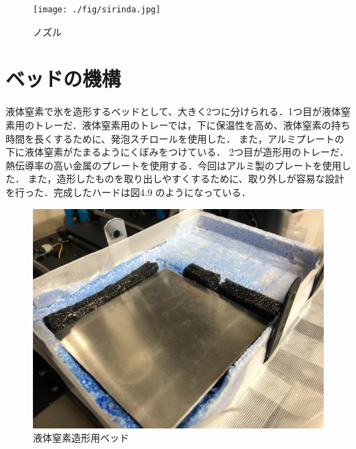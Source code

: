 \begin{figure}[H]
  \centering
  \texttt{[image: ./fig/sirinda.jpg]}
  \caption{ノズル}
  \label{fig:stage}
\end{figure}


\section{ベッドの機構}
\label{sec:paragraph}
液体窒素で氷を造形するベッドとして、大きく2つに分けられる．1つ目が液体窒素用のトレーだ．液体窒素用のトレーでは，下に保温性を高め、液体窒素の持ち時間を長くするために、発泡スチロールを使用した．
また，アルミプレートの下に液体窒素がたまるようにくぼみをつけている．
2つ目が造形用のトレーだ．熱伝導率の高い金属のプレートを使用する．今回はアルミ製のプレートを使用した．
また，造形したものを取り出しやすくするために、取り外しが容易な設計を行った．完成したハードは図4.9 のようになっている．


\begin{figure}[H]
  \centering
  \includegraphics[width=10truecm]{./fig/stage.jpg}
  \caption{液体窒素造形用ベッド}
  \label{fig:stage}
\end{figure}

